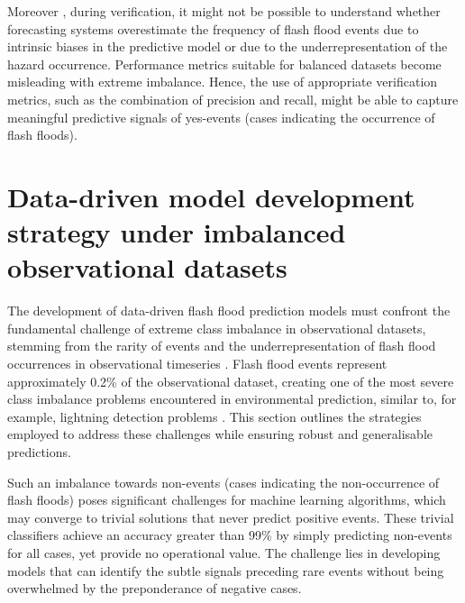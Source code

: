 Moreover , during verification, it might not be possible to understand whether forecasting systems overestimate the frequency of flash flood events due to intrinsic biases in the predictive model or due to the underrepresentation of the hazard occurrence. Performance metrics suitable for balanced datasets become misleading with extreme imbalance. Hence, the use of appropriate verification metrics, such as the combination of precision and recall, might be able to capture meaningful predictive signals of yes-events (cases indicating the occurrence of flash floods).


\section{Data-driven model development strategy under imbalanced observational datasets}
\label{model_development_imbalanced_data}

The development of data-driven flash flood prediction models must confront the fundamental challenge of extreme class imbalance in observational datasets, stemming from the rarity of events and the underrepresentation of flash flood occurrences in observational timeseries \citep{Gaume_2009, Panwar_2020, Marjerison_2016}. Flash flood events represent approximately 0.2\% of the observational dataset, creating one of the most severe class imbalance problems encountered in environmental prediction, similar to, for example, lightning detection problems \citep{Cavaiola_2024}. This section outlines the strategies employed to address these challenges while ensuring robust and generalisable predictions.

Such  an imbalance towards non-events (cases indicating the non-occurrence of flash floods) poses significant challenges for machine learning algorithms, which may converge to trivial solutions that never predict positive events. These trivial classifiers achieve an accuracy greater than 99\% by simply predicting non-events for all cases, yet provide no operational value. The challenge lies in developing models that can identify the subtle signals preceding rare events without being overwhelmed by the preponderance of negative cases.


